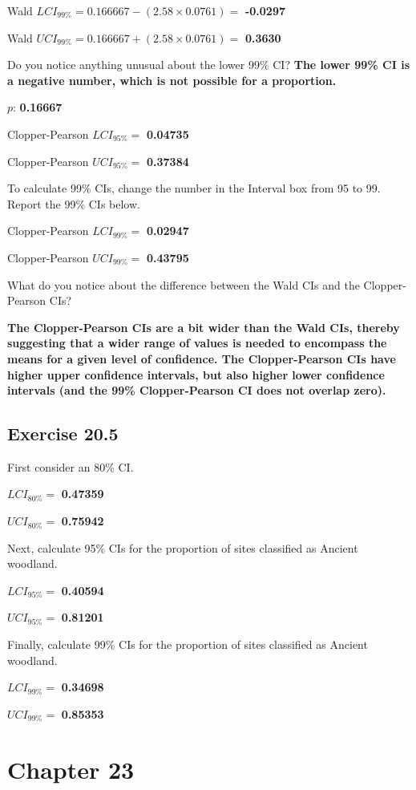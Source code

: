 \documentclass[
  openany]{scrbook}
\begin{document}
Wald \(LCI_{99\%} = 0.166667 - (2.58 \times 0.0761) =\) \textbf{-0.0297}

Wald \(UCI_{99\%} = 0.166667 + (2.58 \times 0.0761) =\) \textbf{0.3630}

Do you notice anything unusual about the lower 99\% CI? \textbf{The lower 99\% CI is a negative number, which is not possible for a proportion.}

\(p\): \textbf{0.16667}

Clopper-Pearson \(LCI_{95\%} =\) \textbf{0.04735}

Clopper-Pearson \(UCI_{95\%} =\) \textbf{0.37384}

To calculate 99\% CIs, change the number in the Interval box from 95 to 99.
Report the 99\% CIs below.

Clopper-Pearson \(LCI_{99\%} =\) \textbf{0.02947}

Clopper-Pearson \(UCI_{99\%} =\) \textbf{0.43795}

What do you notice about the difference between the Wald CIs and the Clopper-Pearson CIs?

\textbf{The Clopper-Pearson CIs are a bit wider than the Wald CIs, thereby suggesting that a wider range of values is needed to encompass the means for a given level of confidence. The Clopper-Pearson CIs have higher upper confidence intervals, but also higher lower confidence intervals (and the 99\% Clopper-Pearson CI does not overlap zero).}

\hypertarget{exercise-20.5}{%
\subsection{Exercise 20.5}\label{exercise-20.5}}

First consider an 80\% CI.

\(LCI_{80\%} =\) \textbf{0.47359}

\(UCI_{80\%} =\) \textbf{0.75942}

Next, calculate 95\% CIs for the proportion of sites classified as Ancient woodland.

\(LCI_{95\%} =\) \textbf{0.40594}

\(UCI_{95\%} =\) \textbf{0.81201}

Finally, calculate 99\% CIs for the proportion of sites classified as Ancient woodland.

\(LCI_{99\%} =\) \textbf{0.34698}

\(UCI_{99\%} =\) \textbf{0.85353}

\hypertarget{chapter-23}{%
\section{Chapter 23}\label{chapter-23}}
\end{document}
